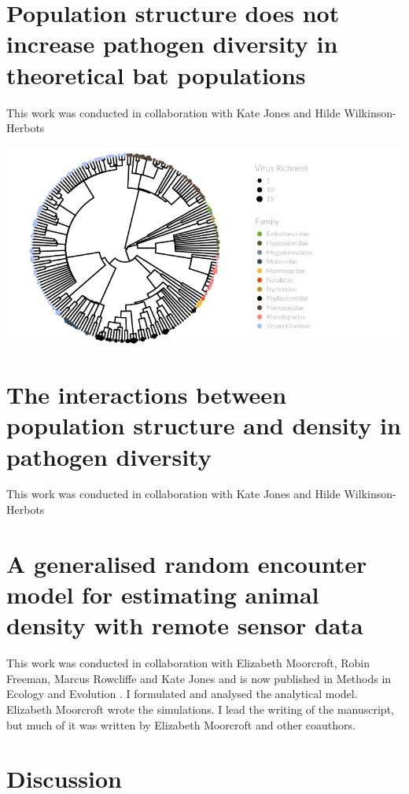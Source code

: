 \documentclass[11pt,phd,a4paper,twoside]{PrettyStanley}
\begin{document}
\chapter{Population structure does not increase pathogen diversity in theoretical bat populations}{This work was conducted in collaboration with Kate Jones and Hilde Wilkinson-Herbots}
\label{ch:sims1}
\begin{center}
\includegraphics[width=\textwidth]{figure/treePlot-1.pdf}
\end{center}


\chapter{The interactions between population structure and density in pathogen diversity}{This work was conducted in collaboration with Kate Jones and Hilde Wilkinson-Herbots}
\label{ch:sims2}



\chapter[gREM for estimating animal density]{A generalised random encounter model for estimating animal density with remote sensor data}{
This work was conducted in collaboration with Elizabeth Moorcroft, Robin Freeman, Marcus Rowcliffe and Kate Jones and is now published in Methods in Ecology and Evolution \cite{lucas2015generalised}.
I formulated and analysed the analytical model.
Elizabeth Moorcroft wrote the simulations.
I lead the writing of the manuscript, but much of it was written by Elizabeth Moorcroft and other coauthors.
}
\label{ch:grem}


\chapter{Discussion}
\label{ch:discussion}




 


\printbibliography 
\end{document}

